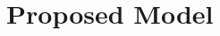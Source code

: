 \documentclass[pdflatex,sn-mathphys-num]{sn-jnl}%
\newcommand\redb[1]{#1}
\theoremstyle{thmstyleone}%
\theoremstyle{thmstyletwo}%
\theoremstyle{thmstylethree}%
\begin{document}

\section{Proposed Model} 
\label{sec:proposed_model}
\end{document}
